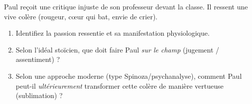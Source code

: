 \documentclass[11pt]{article}
\begin{document}
\begin{exercice}
Paul reçoit une critique injuste de son professeur devant la classe. Il ressent une vive colère (rougeur, cœur qui bat, envie de crier).
\begin{enumerate}
    \item Identifiez la passion ressentie et sa manifestation physiologique.
    \item Selon l'idéal stoïcien, que doit faire Paul \textit{sur le champ} (jugement / assentiment) ?
    \item Selon une approche moderne (type Spinoza/psychanalyse), comment Paul peut-il \textit{ultérieurement} transformer cette colère de manière vertueuse (sublimation) ?
\end{enumerate}
\end{exercice}
\end{document}
